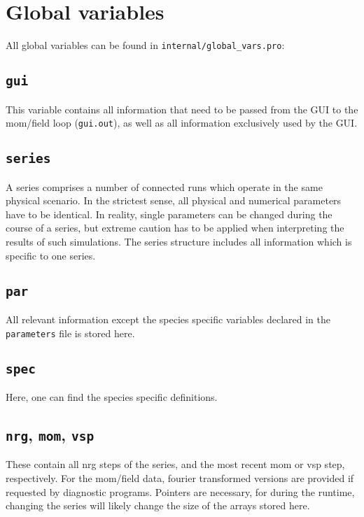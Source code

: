 \documentclass[12pt]{article}
\begin{document}
\section{Global variables}

All global variables can be found in
\texttt{internal/global\_vars.pro}:

\subsection{\texttt{gui}}

This variable contains all information that need to be passed from
the GUI to the mom/field loop (\texttt{gui.out}), as well as all
information exclusively used by the GUI.

\subsection{\texttt{series}}

A series comprises a number of connected runs which operate in the
same physical scenario. In the strictest sense, all physical and
numerical parameters have to be identical. In reality, single
parameters can be changed during the course of a series, but
extreme caution has to be applied when interpreting the results of
such simulations. The series structure includes all information
which is specific to one series.

\subsection{\texttt{par}}

All relevant information except the species specific variables
declared in the \texttt{parameters} file is stored here.

\subsection{\texttt{spec}}

Here, one can find the species specific definitions.

\subsection{\texttt{nrg}, \texttt{mom}, \texttt{vsp}}

These contain all nrg steps of the series, and the most recent
mom or vsp step, respectively. For the mom/field data, 
fourier transformed versions are provided if requested by 
diagnostic programs.
Pointers are necessary, for during the runtime, changing the
series will likely change the size of the arrays stored here.
\end{document}
